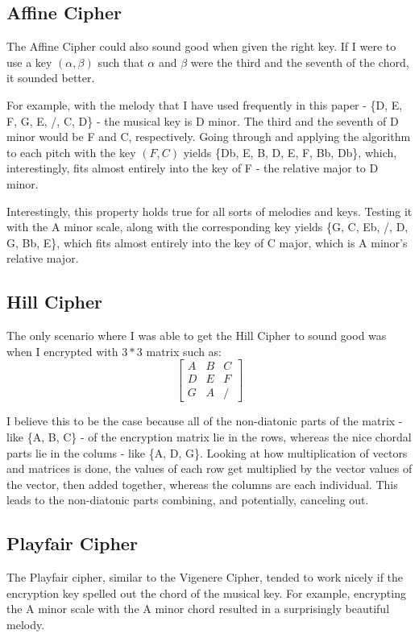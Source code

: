 \documentclass[14pt]{article}
\begin{document}
        \subsection{Affine Cipher}
        The Affine Cipher could also sound good when given the right key. If I were to use a key $(\alpha, \beta)$ such that $\alpha$ and $\beta$ were the third and the seventh of the chord, it sounded better.

        For example, with the melody that I have used frequently in this paper - \{D, E, F, G, E, /, C, D\} - the musical key is D minor. The third and the seventh of D minor would be F and C, respectively. Going through and applying the algorithm to each pitch with the key $(F, C)$ yields \{Db, E, B, D, E, F, Bb, Db\}, which, interestingly, fits almost entirely into the key of F - the relative major to D minor. 
        
        Interestingly, this property holds true for all sorts of melodies and keys. Testing it with the A minor scale, along with the corresponding key yields \{G, C, Eb, /, D, G, Bb, E\}, which fits almost entirely into the key of C major, which is A minor's relative major.

        \subsection{Hill Cipher}
        The only scenario where I was able to get the  Hill Cipher to sound good was when I encrypted with $3 * 3$ matrix such as:
        \[
        \begin{bmatrix}
            A & B & C \\
            D & E & F \\
            G & A & /
        \end{bmatrix}
        \]

        I believe this to be the case because all of the non-diatonic parts of the matrix - like \{A, B, C\} - of the encryption matrix lie in the rows, whereas the nice chordal parts lie in the colums - like \{A, D, G\}. Looking at how multiplication of vectors and matrices is done, the values of each row get multiplied by the vector values of the vector, then added together, whereas the columns are each individual. This leads to the non-diatonic parts combining, and potentially, canceling out.

        \subsection{Playfair Cipher}
        The Playfair cipher, similar to the Vigenere Cipher, tended to work nicely if the encryption key spelled out the chord of the musical key. For example, encrypting the A minor scale with the A minor chord resulted in a surprisingly beautiful melody.
\end{document}
